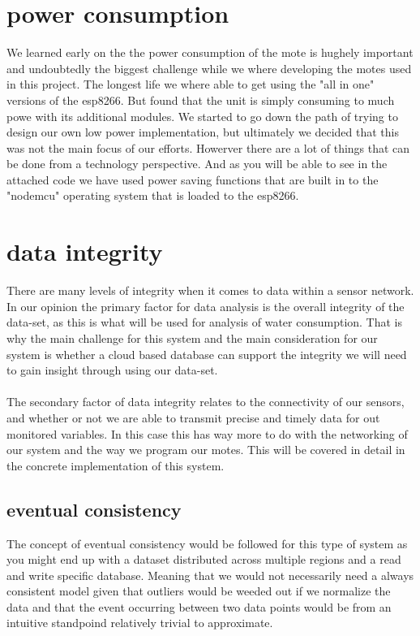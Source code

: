 \documentclass[]{uiophd}
\begin{document}
\section{power consumption}
We learned early on the the power consumption of the mote is hughely important and undoubtedly the biggest challenge while we where developing the motes used in this project. The longest life we where able to get using the "all in one" versions of the esp8266. But found that the unit is simply consuming to much powe with its additional modules. We started to go down the path of trying to design our own low power implementation, but ultimately we decided that this was not the main focus of our efforts. Howerver there are a lot of things that can be done from a technology perspective. And as you will be able to see in the attached code we have used  power saving functions that are built in to the "nodemcu" operating system that is loaded to the esp8266.
\section{data integrity}
There are many levels of integrity when it comes to data within a sensor network. In our opinion the primary factor for data analysis is the overall integrity of the data-set, as this is what will be used for analysis of water consumption. That is why the main challenge for this system and the main consideration for our system is whether a cloud based database can support the integrity we will need to gain insight through using our data-set. 
\\\\
The secondary factor of data integrity relates to the connectivity of our sensors, and whether or not we are able to transmit precise and timely data for out monitored variables. In this case this has way more to do with the networking of our system and the way we program our motes. This will be covered in detail in the concrete implementation of this system.
\subsection{eventual consistency}
The concept of eventual consistency would be followed for this type of system as you might end up with a dataset distributed across multiple regions and a read and write specific database. Meaning that we would not necessarily need a always consistent model given that outliers would be weeded out if we normalize the data and that the event occurring between two data points would be from an intuitive standpoind relatively trivial to approximate.
\end{document}
